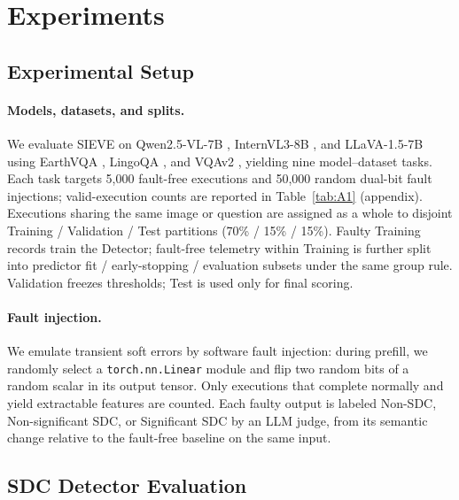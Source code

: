 \section{Experiments}
\label{sec:experiments}
\subsection{Experimental Setup}
\label{sec:setup}

\paragraph{Models, datasets, and splits.}
We evaluate SIEVE on Qwen2.5-VL-7B \cite{Qwen2VL}, InternVL3-8B \cite{chen2024internvl}, and LLaVA-1.5-7B \cite{liu2023visual} using EarthVQA \cite{wang2024earthvqa}, LingoQA \cite{marcu2024lingoqa}, and VQAv2 \cite{balanced_vqa_v2}, yielding nine model--dataset tasks. Each task targets 5{,}000 fault-free executions and 50{,}000 random dual-bit fault injections; valid-execution counts are reported in Table~\ref{tab:A1} (appendix). Executions sharing the same image or question are assigned as a whole to disjoint Training / Validation / Test partitions (70\% / 15\% / 15\%). Faulty Training records train the Detector; fault-free telemetry within Training is further split into predictor fit / early-stopping / evaluation subsets under the same group rule. Validation freezes thresholds; Test is used only for final scoring.

\paragraph{Fault injection.}
We emulate transient soft errors by software fault injection: during prefill, we randomly select a \texttt{torch.nn.Linear} module and flip two random bits of a random scalar in its output tensor. Only executions that complete normally and yield extractable features are counted. Each faulty output is labeled Non-SDC, Non-significant SDC, or Significant SDC by an LLM judge, from its semantic change relative to the fault-free baseline on the same input.

\subsection{SDC Detector Evaluation}

